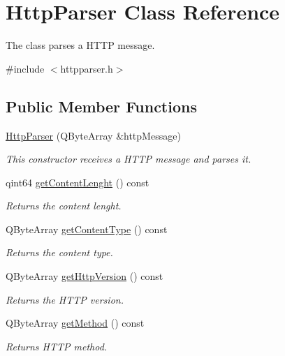 \hypertarget{class_http_parser}{}\section{Http\+Parser Class Reference}
\label{class_http_parser}


The class parses a H\+T\+TP message.  




{\ttfamily \#include $<$httpparser.\+h$>$}

\subsection*{Public Member Functions}
\begin{DoxyCompactItemize}
\item 
\mbox{\hyperlink{class_http_parser_a91e6c1876337b53694347476f277d1a2}{Http\+Parser}} (Q\+Byte\+Array \&http\+Message)
\begin{DoxyCompactList}\small\item\em This constructor receives a H\+T\+TP message and parses it. \end{DoxyCompactList}\item 
qint64 \mbox{\hyperlink{class_http_parser_ad42f6a0ff6ab987ccf526ac995af196f}{get\+Content\+Lenght}} () const
\begin{DoxyCompactList}\small\item\em Returns the content lenght. \end{DoxyCompactList}\item 
Q\+Byte\+Array \mbox{\hyperlink{class_http_parser_a3adf500c4b0cf85d8249e071a7094f20}{get\+Content\+Type}} () const
\begin{DoxyCompactList}\small\item\em Returns the content type. \end{DoxyCompactList}\item 
Q\+Byte\+Array \mbox{\hyperlink{class_http_parser_a760eb9ec81fa1983b8eb5b088b0e6f41}{get\+Http\+Version}} () const
\begin{DoxyCompactList}\small\item\em Returns the H\+T\+TP version. \end{DoxyCompactList}\item 
Q\+Byte\+Array \mbox{\hyperlink{class_http_parser_a283aa2b313491a592babdb5528086f71}{get\+Method}} () const
\begin{DoxyCompactList}\small\item\em Returns H\+T\+TP method. \end{DoxyCompactList}\item 

\end{DoxyCompactItemize}
